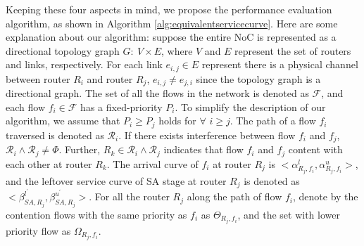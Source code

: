 \documentclass[10pt,journal]{IEEEtran}
\begin{document}
Keeping these four aspects in mind, we propose the performance evaluation algorithm, as shown in Algorithm \ref{alg:equivalentservicecurve}. Here are some explanation about our algorithm: suppose the entire NoC is represented as a directional topology graph $G:\ V\times E$, where $V$ and $E$ represent the set of routers and links, respectively. For each link $e_{i,j}\in E$ represent there is a physical channel between router $R_i$ and router $R_j$, $e_{i,j}\neq e_{j,i}$ since the topology graph is a directional graph. The set of all the flows in the network is denoted as $\mathcal{F}$, and each flow $f_i\in\mathcal{F}$ has a fixed-priority $P_i$. To simplify the description of our algorithm, we assume that $P_i\geq P_j$ holds for $\forall$ $i\geq j$. The path of a flow $f_i$ traversed is denoted as $\mathcal{R}_i$. If there exists interference between flow $f_i$ and $f_j$, $\mathcal{R}_i\wedge\mathcal{R}_j\neq\Phi$. Further, $R_k\in\mathcal{R}_i\wedge\mathcal{R}_j$ indicates that flow $f_i$ and $f_j$ content with each other at router $R_k$. The arrival curve of $f_i$ at router $R_j$ is $<\alpha_{R_j,f_i}^l,\alpha_{R_j,f_i}^u>$, and the leftover service curve of SA stage at router $R_j$ is denoted as $<\beta_{SA,R_j}^{l^\prime},\beta_{SA,R_j}^{u^\prime}>$. For all the router $R_j$ along the path of flow $f_i$, denote by the contention flows with the same priority as $f_i$ as $\Theta_{R_j,f_i}$, and the set with lower priority flow as $\Omega_{R_j,f_i}$.
\end{document}
